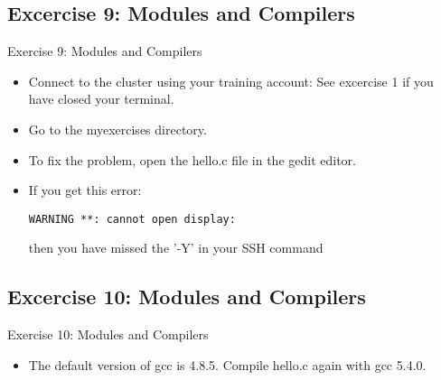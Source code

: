 \documentclass[handout]{beamer} %
\begin{document}
\subsection{Excercise 9: Modules and Compilers}
\begin{frame}[fragile]{Exercise 9: Modules and Compilers}
\begin{itemize}
\item{Connect to the cluster using your training account: See excercise 1 if you have closed your terminal.}
\item{Go to the \alert{myexercises} directory.}
\item{To fix the problem, open the \alert{hello.c} file in the \alert{gedit} editor.}
\item{If you get this error: \begin{verbatim}WARNING **: cannot open display:\end{verbatim} then you have missed the '-Y' in your SSH command}
\end{itemize}
\end{frame}
 
\subsection{Excercise 10: Modules and Compilers}
\begin{frame}[fragile]{Exercise 10: Modules and Compilers}
\begin{itemize} 
\item{The default version of gcc is 4.8.5. Compile hello.c again with \alert{gcc 5.4.0}.}
\end{itemize}
\end{frame}
\end{document}
